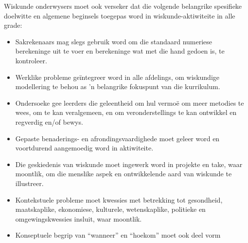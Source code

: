 Wiskunde onderwysers moet ook verseker dat die volgende belangrike
spesifieke doelwitte en algemene beginsels toegepas word in
wiskunde-aktiwiteite in alle grade:
\begin{itemize}[noitemsep]
\item
  Sakrekenaars mag slegs gebruik word om die standaard numeriese
  berekeninge uit te voer en berekeninge wat met die hand gedoen is,
  te kontroleer.
\item
  Werklike probleme ge\"{i}ntegreer word in alle afdelings, om
  wiskundige modellering te behou as 'n belangrike fokuspunt van die
  kurrikulum.
\item
  Ondersoeke gee leerders die geleentheid om hul vermo\"{e} om meer
  metodies te wees, om te kan veralgemeen, en om veronderstellings te
  kan ontwikkel en regverdig en/of bewys.
\item
  Gepaste benaderings- en afrondingsvaardighede moet geleer word en
  voortdurend aangemoedig word in aktiwiteite.
\item
  Die geskiedenis van wiskunde moet ingewerk word in projekte en take,
  waar moontlik, om die menslike aspek en ontwikkelende aard van
  wiskunde te illustreer.
\item
  Kontekstuele probleme moet kwessies met betrekking tot gesondheid,
  maatskaplike, ekonomiese, kulturele, wetenskaplike, politieke en
  omgewingskwessies insluit, waar moontlik.
\item
  Konseptuele begrip van ``wanneer'' en ``hoekom'' moet ook deel vorm

\end{itemize}
